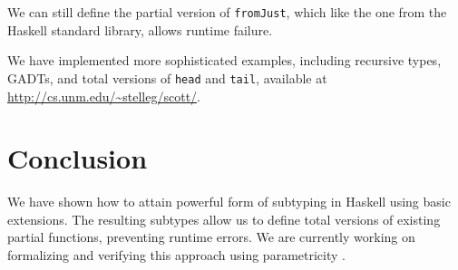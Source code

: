 \documentclass[]{article}
\newenvironment{Shaded}{}{}
\newcommand{\DataTypeTok}[1]{\textcolor[rgb]{0.56,0.13,0.00}{{#1}}}
\newcommand{\StringTok}[1]{\textcolor[rgb]{0.25,0.44,0.63}{{#1}}}
\newcommand{\OtherTok}[1]{\textcolor[rgb]{0.00,0.44,0.13}{{#1}}}
\newcommand{\FunctionTok}[1]{\textcolor[rgb]{0.02,0.16,0.49}{{#1}}}
\newcommand{\NormalTok}[1]{{#1}}
\begin{document}
We can still define the partial version of \texttt{fromJust}, which like
the one from the Haskell standard library, allows runtime failure.

\begin{Shaded}
\end{Shaded}

We have implemented more sophisticated examples, including recursive
types, GADTs, and total versions of \texttt{head} and \texttt{tail},
available at \url{http://cs.unm.edu/~stelleg/scott/}.

\section{Conclusion}\label{conclusion}

We have shown how to attain powerful form of subtyping in Haskell using
basic extensions. The resulting subtypes allow us to define total
versions of existing partial functions, preventing runtime errors. We
are currently working on formalizing and verifying this approach using
parametricity \cite{wadler1989theorems}.
\end{document}
